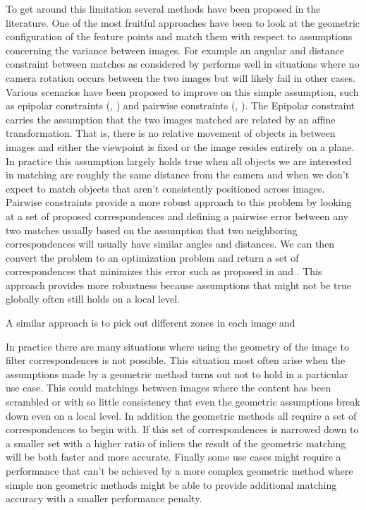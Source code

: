 \documentclass{article}
\begin{document}
To get around this limitation several methods have been proposed in the 
literature. One of the most fruitful approaches have been to look at the 
geometric configuration of the feature points and match them with 
respect to assumptions concerning the variance between images. For 
example an angular and distance constraint between matches as considered 
by \cite{kim2008efficient} performs well in situations where no camera 
rotation occurs between the two images but will likely fail in other 
cases. Various scenarios have been proposed to improve on this simple 
assumption, such as epipolar constraints (\cite{torr2000mlesac}, 
\cite{chum2005matching}) and pairwise constraints 
(\cite{choi2009robust}, \cite{leordenanu2005spectral}). The Epipolar 
constraint carries the assumption that the two images matched are 
related by an affine transformation. That is, there is no relative 
movement of objects in between images and either the viewpoint is fixed 
or the image resides entirely on a plane. In practice this assumption 
largely holds true when all objects we are interested in matching are 
roughly the same distance from the camera and when we don't expect to 
match objects that aren't consistently positioned across images.  
Pairwise constraints provide a more robust approach to this problem by 
looking at a set of proposed correspondences and defining a pairwise 
error between any two matches usually based on the assumption that two 
neighboring correspondences will usually have similar angles and 
distances. We can then convert the problem to an optimization problem 
and return a set of correspondences that minimizes this error such as 
proposed in \cite{choi2009robust} and \cite{leordeanu2005spectral}.  
This approach provides more robustness because assumptions that might 
not be true globally often still holds on a local level.

A similar approach is to pick out different zones in each image and 

In practice there are many situations where using the geometry of the 
image to filter correspondences is not possible. This situation most 
often arise when the assumptions made by a geometric method turns out 
not to hold in a particular use case. This could matchings between 
images where the content has been scrambled or with so little 
consistency that even the geometric assumptions break down even on a 
local level. In addition the geometric methods all require a set of 
correspondences to begin with. If this set of correspondences is 
narrowed down to a smaller set with a higher ratio of inliers the result 
of the geometric matching will be both faster and more accurate. Finally 
some use cases might require a performance that can't be achieved by a 
more complex geometric method where simple non geometric methods might 
be able to provide additional matching accuracy with a smaller 
performance penalty.
\end{document}

